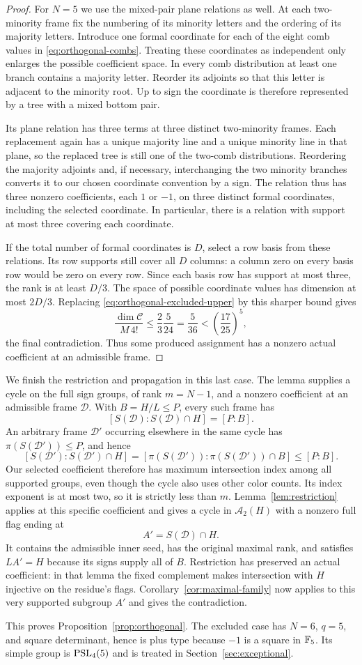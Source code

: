 \begin{proof}
For $N=5$ we use the mixed-pair plane relations as well.  At each
two-minority frame fix the numbering of its minority letters and the
ordering of its majority letters.  Introduce one formal coordinate
for each of the eight comb values in \eqref{eq:orthogonal-combs}.
Treating these coordinates as independent only enlarges the possible
coefficient space.  In every comb distribution at least one branch
contains a majority letter.  Reorder its adjoints so that this letter
is adjacent to the minority root.  Up to sign the coordinate is
therefore represented by a tree with a mixed bottom pair.

Its plane relation has three terms at three distinct two-minority
frames.  Each replacement again has a unique majority line and a
unique minority line in that plane, so the replaced tree is still
one of the two-comb distributions.  Reordering the majority adjoints
and, if necessary, interchanging the two minority branches converts
it to our chosen coordinate convention by a sign.  The relation thus
has three nonzero coefficients, each $1$ or $-1$, on three distinct
formal coordinates, including the selected coordinate.  In
particular, there is a relation with support at most three covering
each coordinate.

If the total number of formal coordinates is $D$, select a row basis
from these relations.  Its row supports still cover all $D$ columns:
a column zero on every basis row would be zero on every row.  Since
each basis row has support at most three, the rank is at least $D/3$.
The space of possible coordinate values has dimension at most $2D/3$.
Replacing \eqref{eq:orthogonal-excluded-upper} by this sharper bound
gives
\[
 \frac{\dim\mathcal C}{M\,4!}
 \le\frac23\frac5{24}=\frac5{36}
 <\left(\frac{17}{25}\right)^5,
\]
the final contradiction.  Thus some produced assignment has a
nonzero actual coefficient at an admissible frame.
\end{proof}

We finish the restriction and propagation in this last case.  The
lemma supplies a cycle on the full sign groups, of rank $m=N-1$, and
a nonzero coefficient at an admissible frame $\mathcal D$.  With
$B=H/L\le P$, every such frame has
\[
 [S(\mathcal D):S(\mathcal D)\cap H]=[P:B].
\]
An arbitrary frame $\mathcal D'$ occurring elsewhere in the same cycle
has $\pi(S(\mathcal D'))\le P$, and hence
\[
 [S(\mathcal D'):S(\mathcal D')\cap H]
 =[\pi(S(\mathcal D')):\pi(S(\mathcal D'))\cap B]
 \le[P:B].
\]
Our selected coefficient therefore has maximum intersection index
among all supported groups, even though the cycle also uses other
color counts.  Its index exponent is at most two, so it is strictly
less than $m$.  Lemma~\ref{lem:restriction} applies at this specific
coefficient and gives a cycle in $\mathcal A_2(H)$ with a nonzero full
flag ending at
\[
 A'=S(\mathcal D)\cap H.
\]
It contains the admissible inner seed, has the original maximal rank,
and satisfies $LA'=H$ because its signs supply all of $B$.  Restriction
has preserved an actual coefficient: in that lemma the fixed
complement makes intersection with $H$ injective on the residue's
flags. Corollary~\ref{cor:maximal-family} now applies to this very
supported subgroup $A'$ and gives the contradiction.

This proves Proposition~\ref{prop:orthogonal}.  The excluded case has
$N=6$, $q=5$, and square determinant, hence is plus type because
$-1$ is a square in $\mathbb F_5$.  Its simple group is $\operatorname{PSL}_4(5)$ and is
treated in Section~\ref{sec:exceptional}.
